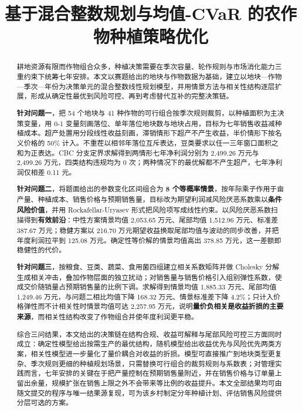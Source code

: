 \documentclass[bwprint]{gmcmthesis}
\title{基于混合整数规划与均值-CVaR 的农作物种植策略优化}
\begin{document}
\label{body:start}

\maketitle

\begin{abstract}\label{abstract:start}
耕地资源有限而作物组合众多，种植决策需要在季次容量、轮作规则与市场消化能力三重约束下统筹七年安排。本文以赛题给出的地块与作物数据为基础，建立以地块—作物—季次—年份为决策单元的混合整数线性规划模型，并用情景方法与相关性结构逐层扩展，形成从确定性最优到风险可控、再到考虑替代互补的完整决策链。

\textbf{针对问题一}，把 54 个地块与 41 种作物的可行组合按季次规则裁剪，以种植面积为主决策变量，用 0-1 变量刻画落位、单年落位地块数与地块占用，目标为七年销售收益减种植成本。超产处置用分段线性收益刻画，滞销情形下超产不产生收益，半价情形下按名义价格的 50\% 计入。不重茬以相邻年落位互斥表达，豆类要求以任一三年窗口面积之和为正表达。CBC 分支定界求解得到两情形七年净利润分别为 2,499.26 万元与 2,499.26 万元，四类结构违规均为 0 次；两种情况下的最优解都不产生超产，七年净利润仅相差 0.11 元。

\textbf{针对问题二}，将题面给出的参数变化区间组合为 \textbf{8 个等概率情景}，按年际乘子作用于亩产量、种植成本、销售价格与预期销售量，目标改为期望利润减风险厌恶系数乘以\textbf{条件风险价值}，并用 Rockafellar-Uryasev 形式把风险项写成线性约束。以风险厌恶系数扫描得到\textbf{有效前沿}：中性方案情景均值 2,053.65 万元、尾部均值 1,512.96 万元、标准差 387.67 万元；稳健方案以 216.70 万元期望收益换取尾部均值与波动的同步改善，并把年度利润拉平到 125.08 万元。确定性等价解的情景均值高出 378.85 万元，这一差额即稳健性的代价。

\textbf{针对问题三}，按粮食、豆类、蔬菜、食用菌四组建立相关系数矩阵并做 Cholesky 分解生成相关冲击，叠加作物层面的独立扰动；对销售量与销售价格引入组别弹性系数，使成交价随销量占预期销售量的比例下调。求解得到情景均值 1,885.33 万元、尾部均值 1,249.46 万元，与问题二相比均值下降 168.32 万元、情景标准差下降 4.2\%；只计入价格弹性而不计相关性时情景均值可达 2,257.95 万元，说明\textbf{量价负相关是收益折损的主要来源}，而相关性结构改变了作物组合并使年度利润更平稳。

综合三问结果，本文给出的决策链在结构合规、收益可解释与尾部风险可控三方面同时成立：确定性模型给出按需生产的最优结构，随机模型给出收益优先与风险优先两类方案，相关性模型进一步量化了量价耦合对收益的折损。模型可直接推广到地块类型更复杂、季次规则更细的种植规划场景，只需替换可行组合的裁剪规则与系数表；对管理实践而言，七年安排的关键在于把产量控制在预期销售量附近，并在销售价格与订单量上留出余量，规模扩张在销售上限之外不会带来等比例的收益提升。本文全部结果均可由随文提交的程序与唯一结果源复现，可为该乡村制定分年种植计划、评估销售风险提供分层可选的方案。

\label{abstract:end}

\end{abstract}
\end{document}
